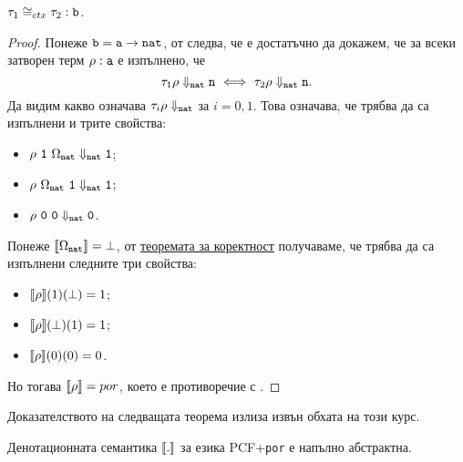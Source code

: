 \begin{proposition}
  $\tau_1 \cong_{ctx} \tau_2 : \texttt{b}$.
\end{proposition}
\begin{proof}
  Понеже $\texttt{b} = \texttt{a} \to \texttt{nat}$, от  следва, че е достатъчно да докажем, че
  за всеки затворен терм $\rho:\texttt{a}$ е изпълнено, че
  \[\tau_1\rho \Downarrow_{\texttt{nat}} \texttt{n} \ \Longleftrightarrow\  \tau_2\rho \Downarrow_{\texttt{nat}} \texttt{n}.\]
  Да видим какво означава $\tau_i \rho \Downarrow_{\texttt{nat}}$ за $i = 0,1$.
  Това означава, че трябва да са изпълнени и трите свойства:
  \begin{itemize}
  \item
    $\rho\ \texttt{1}\ \Omega_{\texttt{nat}} \Downarrow_{\texttt{nat}} \texttt{1}$;%
  \item
    $\rho\ \Omega_{\texttt{nat}}\ \texttt{1} \Downarrow_{\texttt{nat}} \texttt{1}$;%
  \item
    $\rho\ \texttt{0}\ \texttt{0} \Downarrow_{\texttt{nat}} \texttt{0}$.
  \end{itemize}
  Понеже $\llbracket{\Omega_{\texttt{nat}}}\rrbracket = \bot$, от \hyperref[th:pcf:soundness]{теоремата за коректност} получаваме, че трябва да са изпълнени следните три свойства:
  \begin{itemize}
  \item
    $\llbracket{\rho}\rrbracket(1)(\bot) = 1$;
  \item
    $\llbracket{\rho}\rrbracket(\bot)(1) = 1$;
  \item
    $\llbracket{\rho}\rrbracket(0)(0) = 0$.
  \end{itemize}
  Но тогава $\llbracket{\rho}\rrbracket = por$, което е противоречие с .
\end{proof}

Доказателството на следващата теорема излиза извън обхата на този курс.
\begin{framed}
  \begin{theorem}[Плоткин 1977]
    Денотационната семантика $\llbracket{.}\rrbracket$ за езика PCF+\texttt{por} е напълно абстрактна.
  \end{theorem}
\end{framed}


